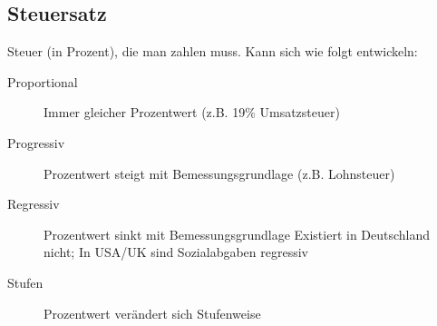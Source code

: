 \documentclass{beamer}
\begin{document}
%	
	
		\subsection{Steuersatz}
		
			\begin{frame}
				Steuer (in Prozent), die man zahlen muss. Kann sich wie folgt entwickeln:\n
				\begin{description}
					\item[Proportional] Immer gleicher Prozentwert (z.B. 19\% Umsatzsteuer)
					\item[Progressiv] Prozentwert steigt mit Bemessungsgrundlage (z.B. Lohnsteuer)
					\item[Regressiv] Prozentwert sinkt mit Bemessungsgrundlage \vspace{0.1cm}\newline
					{\tiny Existiert in Deutschland nicht; In USA/UK sind Sozialabgaben regressiv\\}
					\item[Stufen] Prozentwert verändert sich Stufenweise
				\end{description}
			\end{frame}
			
\end{document}
